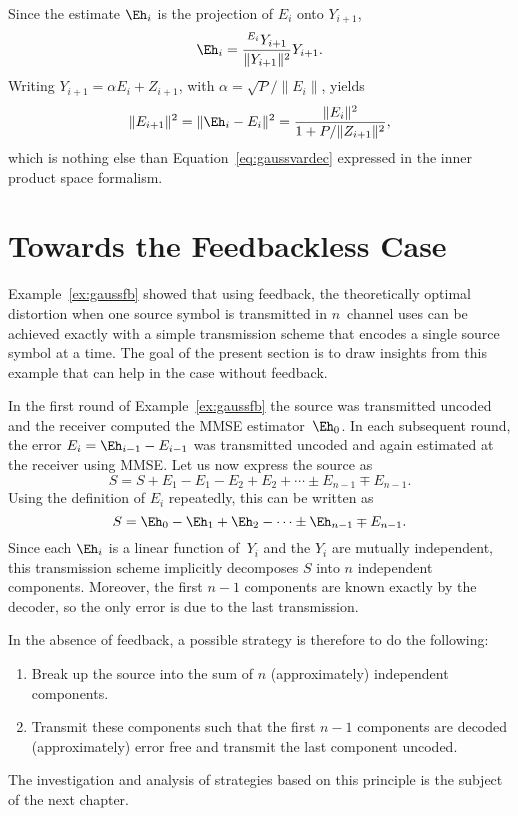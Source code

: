 Since the estimate $\Eh_i$ is the projection of $E_i$ onto $Y_{i+1}$, 
\begin{equation*}
  \Eh_i = \frac{\sp{E_i}{Y_{i+1}}}{\|Y_{i+1}\|^2} Y_{i+1}.
\end{equation*}
Writing $Y_{i+1} = \alpha E_i + Z_{i+1}$, with $\alpha = \sqrt{P}/\|E_i\|$,
yields
\begin{equation*}
  \|E_{i+1}\|^2 = \|\Eh_i - E_i\|^2 = \frac{\|E_i\|^2}{1 + P/\|Z_{i+1}\|^2},
\end{equation*}
which is nothing else than Equation~\ref{eq:gaussvardec} expressed in the inner
product space formalism.


\section{Towards the Feedbackless Case}

Example~\ref{ex:gaussfb} showed that using feedback, the theoretically optimal
distortion when one source symbol is transmitted in $n$~channel uses can be
achieved exactly with a simple transmission scheme that encodes a single source
symbol at a time. The goal of the present section is to draw insights from this
example that can help in the case without feedback. 

In the first round of Example~\ref{ex:gaussfb} the source was
transmitted uncoded and the receiver computed the MMSE estimator~$\Eh_0$. In
each subsequent round, the error $E_i = \Eh_{i-1} - E_{i-1}$ was transmitted
uncoded and again estimated at the receiver using MMSE. Let us now express the
source as
\begin{equation*}
  S = S + E_1 - E_1 - E_2 + E_2 + \cdots \pm E_{n-1} \mp E_{n-1}.
\end{equation*}
Using the definition of $E_i$ repeatedly, this can be written as
\begin{equation*}
  S = \Eh_0 - \Eh_1 + \Eh_2 - \cdots \pm \Eh_{n-1} \mp E_{n-1}.
\end{equation*}
Since each $\Eh_i$ is a linear function of~$Y_i$ and the $Y_i$ are mutually
independent, this transmission scheme implicitly decomposes $S$ into
$n$ independent components. Moreover, the first $n-1$ components are known
exactly by the decoder, so the only error is due to the last transmission.

In the absence of feedback, a possible strategy is therefore to do the
following:
\begin{enumerate}
  \item Break up the source into the sum of $n$ (approximately) independent
    components.
  \item Transmit these components such that the first $n-1$ components are
    decoded (approximately) error free and transmit the last component uncoded.
\end{enumerate}

The investigation and analysis of strategies based on this principle is the
subject of the next chapter. 

